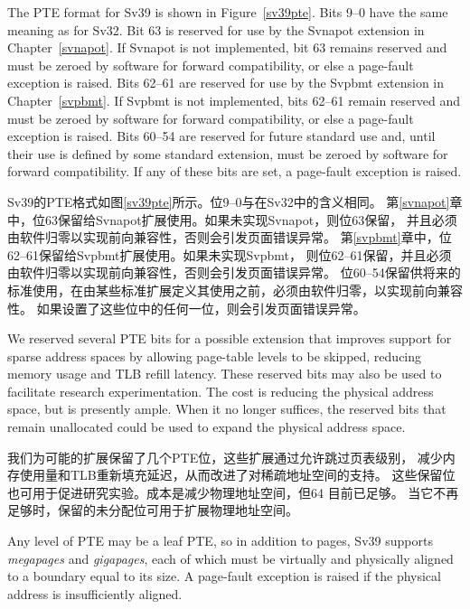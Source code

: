 The PTE format for Sv39 is shown in Figure~\ref{sv39pte}.  Bits 9--0
have the same meaning as for Sv32.
Bit 63 is reserved for use by the Svnapot extension in
Chapter~\ref{svnapot}.  If Svnapot is not implemented, bit 63 remains
reserved and must be zeroed by software for forward compatibility,
or else a page-fault exception is raised.
Bits 62--61 are reserved for use by the Svpbmt extension in
Chapter~\ref{svpbmt}.  If Svpbmt is not implemented, bits 62--61 remain
reserved and must be zeroed by software for forward compatibility,
or else a page-fault exception is raised.
Bits 60--54 are reserved
for future standard use and, until their use is defined by some standard
extension, must be zeroed by software for forward compatibility.
If any of these bits are set, a page-fault exception is raised.

Sv39的PTE格式如图\ref{sv39pte}所示。位9--0与在Sv32中的含义相同。
第\ref{svnapot}章中，位63保留给Svnapot扩展使用。如果未实现Svnapot，则位63保留，
并且必须由软件归零以实现前向兼容性，否则会引发页面错误异常。
第\ref{svpbmt}章中，位62--61保留给Svpbmt扩展使用。如果未实现Svpbmt，
则位62--61保留，并且必须由软件归零以实现前向兼容性，否则会引发页面错误异常。
位60--54保留供将来的标准使用，在由某些标准扩展定义其使用之前，必须由软件归零，以实现前向兼容性。
如果设置了这些位中的任何一位，则会引发页面错误异常。

\begin{commentary}
We reserved several PTE bits for a possible extension that improves
support for sparse address spaces by allowing page-table levels to be
skipped, reducing memory usage and TLB refill latency.  These reserved
bits may also be used to facilitate research experimentation.  The
cost is reducing the physical address space, but  is
presently ample.  When it no longer suffices, the reserved
bits that remain unallocated could be used to expand the physical
address space.

我们为可能的扩展保留了几个PTE位，这些扩展通过允许跳过页表级别，
减少内存使用量和TLB重新填充延迟，从而改进了对稀疏地址空间的支持。
这些保留位也可用于促进研究实验。成本是减少物理地址空间，但64 目前已足够。
当它不再足够时，保留的未分配位可用于扩展物理地址空间。
\end{commentary}
Any level of PTE may be a leaf PTE, so in addition to 
pages, Sv39 supports  {\em megapages} and
 {\em gigapages}, each of which must be virtually and
physically aligned to a boundary equal to its size.
A page-fault exception is raised if the physical address is insufficiently
aligned.

